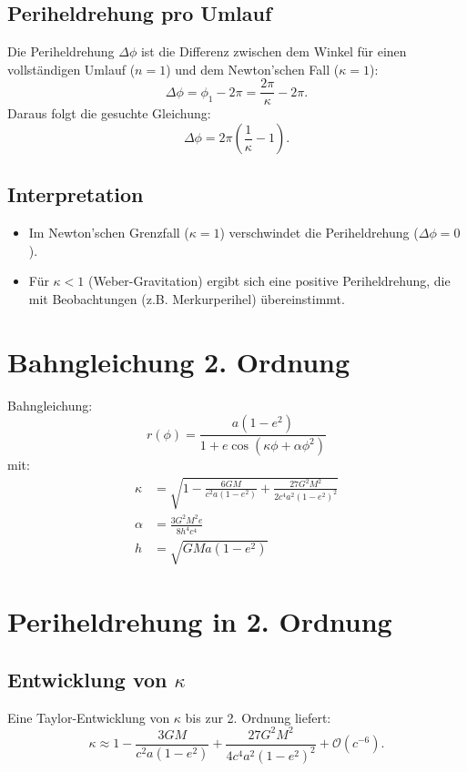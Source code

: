 \subsection{Periheldrehung pro Umlauf}
Die Periheldrehung $\Delta\phi$ ist die Differenz zwischen dem Winkel für einen vollständigen Umlauf ($n = 1$) und dem Newton'schen Fall ($\kappa = 1$):
\begin{equation}
\Delta\phi = \phi_1 - 2\pi = \frac{2\pi}{\kappa} - 2\pi.
\end{equation}
Daraus folgt die gesuchte Gleichung:
\begin{equation}
\boxed{\Delta\phi = 2\pi\left(\frac{1}{\kappa} - 1\right)}.
\end{equation}

\subsection{Interpretation}
\begin{itemize}
\item Im Newton'schen Grenzfall ($\kappa = 1$) verschwindet die Periheldrehung ($\Delta\phi = 0$).
\item Für $\kappa < 1$ (Weber-Gravitation) ergibt sich eine positive Periheldrehung, die mit Beobachtungen (z.B. Merkurperihel) übereinstimmt.
\end{itemize}

\section{Bahngleichung 2. Ordnung}
Bahngleichung:
\begin{equation}
    \boxed
    {
        r(\phi) = \frac{a(1-e^2)}{1 + e\cos\left(\kappa\phi + \alpha\phi^2\right)}
    }
\end{equation}
mit:
\begin{align}
\kappa &= \sqrt{1 - \frac{6GM}{c^2a(1-e^2)} + \frac{27G^2M^2}{2c^4a^2(1-e^2)^2}}\\
\alpha &= \frac{3G^2M^2e}{8h^4c^4}\\
h &= \sqrt{GMa(1 - e^2)}
\end{align}

\section{Periheldrehung in 2. Ordnung}
\subsection{Entwicklung von $\kappa$}
Eine Taylor-Entwicklung von $\kappa$ bis zur 2. Ordnung liefert:
\begin{equation}
\kappa \approx 1 - \frac{3GM}{c^2 a(1 - e^2)} + \frac{27G^2 M^2}{4c^4 a^2 (1 - e^2)^2} + \mathcal{O}(c^{-6}).
\end{equation}

